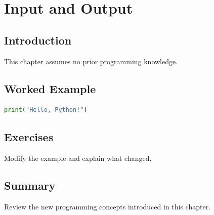 \chapter{Input and Output}
\label{chap:vol3-4}



\section{Introduction}
This chapter assumes no prior programming knowledge.

\section{Worked Example}
\begin{lstlisting}[language=Python]
print("Hello, Python!")
\end{lstlisting}

\section{Exercises}
\begin{exercise}
Modify the example and explain what changed.
\end{exercise}

\section{Summary}
Review the new programming concepts introduced in this chapter.
